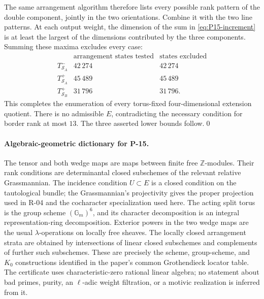 The same arrangement algorithm therefore lists every possible rank
pattern of the double component, jointly in the two orientations.
Combine it with the two line patterns.  At each output weight, the
dimension of the sum in \eqref{eq:P15-increment} is at least the largest
of the dimensions contributed by the three components.  Summing these
maxima excludes every case:
\[
\begin{array}{c|r|r}
 &\text{arrangement states tested}&\text{states excluded}\\\hline
 T^-_{\mathcal S_A}&42\,274&42\,274\\
 T^+_{\mathcal S_A}&45\,489&45\,489\\
 T^+_{\mathcal S_B}&31\,796&31\,796.
\end{array}
\]
This completes the enumeration of every torus-fixed four-dimensional
extension quotient.  There is no admissible $E$, contradicting the
necessary condition for border rank at most $13$.  The three asserted
lower bounds follow.\qed

\paragraph{Algebraic-geometric dictionary for P-15.}
The tensor and both wedge maps are maps between finite free
$\mathbb Z$-modules.  Their rank conditions are determinantal closed
subschemes of the relevant relative Grassmannian.  The incidence
condition $U\subset E$ is a closed condition on the tautological bundle;
the Grassmannian's projectivity gives the proper projection used in R-04
and the cocharacter specialization used here.  The acting split torus is
the group scheme $(\mathbb G_m)^6$, and its character decomposition is
an integral representation-ring decomposition.  Exterior powers in the
two wedge maps are the usual $\lambda$-operations on locally free sheaves.
The locally closed arrangement strata are obtained by intersections of
linear closed subschemes and complements of further such subschemes.
These are precisely the scheme, group-scheme, and $K_0$ constructions
identified in the paper's common Grothendieck locator table.
The certificate uses characteristic-zero rational linear algebra;
no statement about bad primes, purity, an $\ell$-adic weight filtration,
or a motivic realization is inferred from it.
